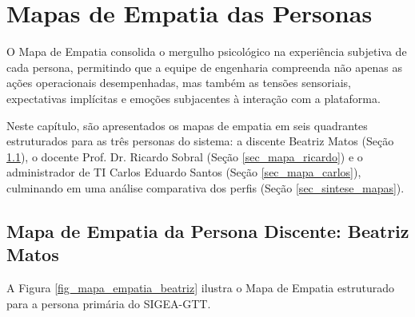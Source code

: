 \chapter{Mapas de Empatia das Personas}
\label{cap_mapas_empatia}

O Mapa de Empatia consolida o mergulho psicológico na experiência subjetiva de cada persona, permitindo que a equipe de engenharia compreenda não apenas as ações operacionais desempenhadas, mas também as tensões sensoriais, expectativas implícitas e emoções subjacentes à interação com a plataforma.

Neste capítulo, são apresentados os mapas de empatia em seis quadrantes estruturados para as três personas do sistema: a discente Beatriz Matos (Seção \ref{sec_mapa_beatriz}), o docente Prof. Dr. Ricardo Sobral (Seção \ref{sec_mapa_ricardo}) e o administrador de TI Carlos Eduardo Santos (Seção \ref{sec_mapa_carlos}), culminando em uma análise comparativa dos perfis (Seção \ref{sec_sintese_mapas}).

\section{Mapa de Empatia da Persona Discente: Beatriz Matos}
\label{sec_mapa_beatriz}

A Figura \ref{fig_mapa_empatia_beatriz} ilustra o Mapa de Empatia estruturado para a persona primária do SIGEA-GTT.

